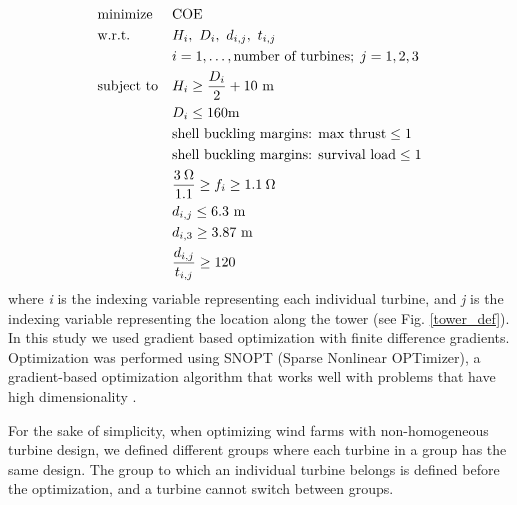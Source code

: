 \documentclass[conf]{new-aiaa}
\begin{document}
 
 \begin{equation}
			\begin{aligned}
				& \text{minimize}
					& & \text{COE} \\
                & \text{w.r.t.} 
                    && H_{i},~ D_{i},
                        ~ d_{i,j},~ t_{i,j}\\
                		&&& i = 1, \ldots, \text{number of turbines}; \; j = 1,2,3 \\
				& \text{subject to}
                        & & H_i \geq \frac{D_i}{2}+10~ \text{m}\\
                        &&& D_i \leq 160 \text{m} \\
                		&&& \text{shell buckling margins: max thrust} \leq 1 \\
                        &&& \text{shell buckling margins: survival load} \leq 1 \\
                        &&& \frac{3\hspace{0.08cm}\Omega}{1.1} \geq f_{i} \geq 1.1\hspace{0.08cm}\Omega \\
                        &&& d_{i,j} \leq 6.3~ \text{m}\\
                		&&& d_{i,3} \geq 3.87~ \text{m}\\
                		&&& \frac{d_{i,j}}{t_{i,j}} \geq 120 \\
			\end{aligned}
		\end{equation}
\noindent where \textit{i} is the indexing variable representing each individual turbine, and \textit{j} is the indexing variable representing the location along the tower (see Fig. \ref{tower_def}). In this study we used gradient based optimization with finite difference gradients. Optimization was performed using SNOPT (Sparse Nonlinear OPTimizer), a gradient-based optimization algorithm that works well with problems that have high dimensionality \cite{SNOPT}. 

For the sake of simplicity, when optimizing wind farms with non-homogeneous turbine design, we defined different groups where each turbine in a group has the same design. The group to which an individual turbine belongs is defined before the optimization, and a turbine cannot switch between groups. 
\end{document}
